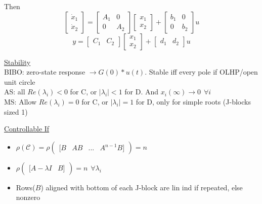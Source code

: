 \documentclass[twocolumn]{article}    %
\begin{document}
Then 
\begin{equation*}
\begin{bmatrix}
    \Dot{x}_1 \\ \Dot{x}_2
\end{bmatrix} = \begin{bmatrix}
    A_1 & 0 \\ 0 & A_2
\end{bmatrix} \begin{bmatrix}
    x_1\\x_2
\end{bmatrix} + \begin{bmatrix}
    b_1 & 0 \\ 0 & b_2
\end{bmatrix} u
\end{equation*}
\begin{equation*}
    y = \begin{bmatrix}
        C_1 & C_2
    \end{bmatrix} \begin{bmatrix}
    x_1\\x_2
\end{bmatrix} + \begin{bmatrix}
    d_1 & d_2 
\end{bmatrix} u
\end{equation*}

\noindent
\underline{Stability}\\
BIBO: zero-state response \(\to G(0)*u(t)\). Stable iff every pole if OLHP/open unit circle\\
AS: all \(Re(\lambda_i)<0\) for C, or \(|\lambda_i|<1\) for D. And \(x_i(\infty) \to 0 \hspace{5pt} \forall i\)\\
MS: Allow \(Re(\lambda_i) = 0\) for C, or \(|\lambda_i|=1\) for D, only for simple roots (J-blocks sized 1)
    
\noindent
\underline{Controllable If}
\begin{itemize}
    \item \(\rho(\mathcal{C}) = \rho(\begin{matrix}
        [B & AB & ... & A^{n-1}B]
    \end{matrix}) = n\) 
    \item \(\rho(\begin{matrix}
        [A-\lambda I & B]
    \end{matrix}) = n \hspace{5pt} \forall \lambda_i\)
    \item Rows(\(B\)) aligned with bottom of each J-block are lin ind if repeated, else nonzero
\end{itemize}
\end{document}
